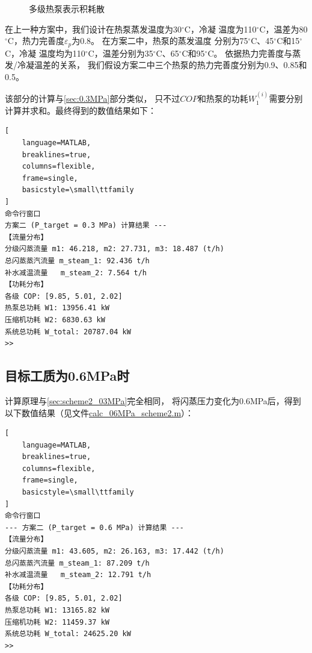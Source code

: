 \documentclass{thuemp}
\begin{document}
\begin{figure}[htbp]



\caption{多级热泵表示积耗散}
\label{fig:scheme2_TQ}
\end{figure}


在上一种方案中，我们设计在热泵蒸发温度为30$^\circ$C，冷凝
温度为110$^\circ$C，温差为80$^\circ$C，热力完善度$\varepsilon_p$为0.8。
在方案二中，热泵的蒸发温度
分别为75$^\circ$C、45$^\circ$C和15$^\circ$C，冷凝
温度均为110$^\circ$C，温差分别为35$^\circ$C、65$^\circ$C和95$^\circ$C。
依据热力完善度与蒸发/冷凝温差的关系，
我们假设方案二中三个热泵的热力完善度分别为0.9、0.85和0.5。

该部分的计算与\ref{sec:0.3MPa}部分类似，
只不过$COP$和热泵的功耗$W_1^{(i)}$需要分别计算并求和。最终得到的数值结果如下：

\begin{lstlisting}[
    language=MATLAB,
    breaklines=true,
    columns=flexible,
    frame=single,
    basicstyle=\small\ttfamily
]
命令行窗口
方案二 (P_target = 0.3 MPa) 计算结果 ---
【流量分布】
分级闪蒸流量 m1: 46.218, m2: 27.731, m3: 18.487 (t/h)
总闪蒸蒸汽流量 m_steam_1: 92.436 t/h
补水减温流量   m_steam_2: 7.564 t/h
【功耗分布】
各级 COP: [9.85, 5.01, 2.02]
热泵总功耗 W1: 13956.41 kW
压缩机功耗 W2: 6830.63 kW
系统总功耗 W_total: 20787.04 kW
>> 
\end{lstlisting}



\subsection{目标工质为0.6MPa时}\label{sec:scheme2_06MPa}

计算原理与\ref{sec:scheme2_03MPa}完全相同，
将闪蒸压力变化为0.6MPa后，得到以下数值结果（见文件\url{calc_06MPa_scheme2.m}）：

\begin{lstlisting}[
    language=MATLAB,
    breaklines=true,
    columns=flexible,
    frame=single,
    basicstyle=\small\ttfamily
]
命令行窗口
--- 方案二 (P_target = 0.6 MPa) 计算结果 ---
【流量分布】
分级闪蒸流量 m1: 43.605, m2: 26.163, m3: 17.442 (t/h)
总闪蒸蒸汽流量 m_steam_1: 87.209 t/h
补水减温流量   m_steam_2: 12.791 t/h
【功耗分布】
各级 COP: [9.85, 5.01, 2.02]
热泵总功耗 W1: 13165.82 kW
压缩机功耗 W2: 11459.37 kW
系统总功耗 W_total: 24625.20 kW
>> 
\end{lstlisting}
\end{document}
